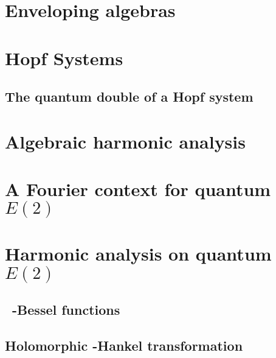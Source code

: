 \documentclass{book}
\begin{document}



\chapter{Enveloping algebras}
\label{chapter:Enveloping_algebras}










\chapter{Hopf Systems}
\label{chapter:Hopf_systems}









\section{The quantum double of a Hopf system}
\label{quantum_double}





\chapter{Algebraic harmonic analysis}
\label{chapter:algebraic_harmonic_analysis}




\chapter{A Fourier context for quantum $E(2)$}
\label{chapter:Fourier_context_for_quantumE2}








\chapter{Harmonic analysis on quantum $E(2)$}
\label{chapter:Harmonic_analysis_on_quantumE2}


\section{\Little\ {\protect\qfragile}-Bessel functions}
\label{sec:qExp_and_qBessel}



\section{Holomorphic {\protect\qfragile}-Hankel transformation}
\label{sec:qHankel}





\end{document}
